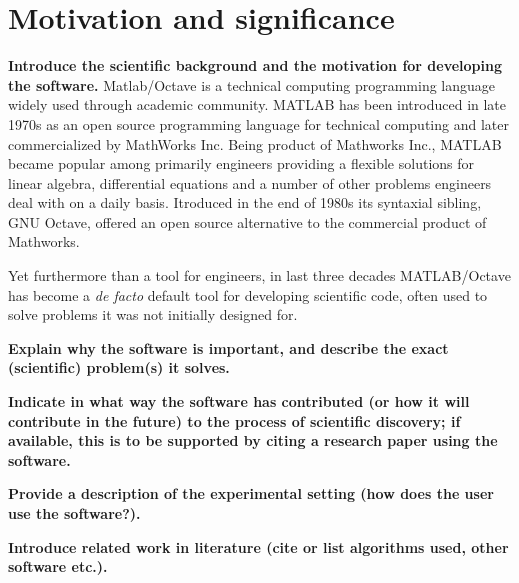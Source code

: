 \section{Motivation and significance}
\label{} 

\textbf{Introduce the scientific background and the motivation for developing the software.}
Matlab/Octave is a technical computing programming language widely used through academic community. MATLAB has been introduced in late 1970s as an open source programming language for technical computing and later commercialized by MathWorks Inc. Being product of Mathworks Inc., MATLAB became popular among primarily engineers providing a flexible solutions for linear algebra, differential equations and a number of other problems engineers deal with on a daily basis. Itroduced in the end of 1980s its syntaxial sibling, GNU Octave, offered an open source alternative to the commercial product of Mathworks\cite{eaton1997gnu}.

Yet furthermore than a tool for engineers, in last three decades MATLAB/Octave has become a \textit{de facto} default tool for developing scientific code, often used to solve problems it was not initially designed for.    

\textbf{Explain why the software is important, and describe the exact (scientific) problem(s) it solves.}


\textbf{Indicate in what way the software has contributed (or how it will contribute in the future) to the process of scientific discovery; if available, this is to be supported by citing a research paper using the software.}


\textbf{Provide a description of the experimental setting (how does the user use the software?).}


\textbf{Introduce related work in literature (cite or list algorithms used, other software etc.).}

    
    
